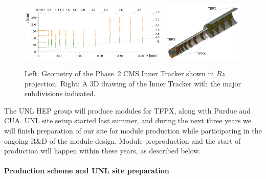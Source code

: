 \begin{figure}
\centering\includegraphics[width=0.63\textwidth]{figs/phase2_inner_tracker_geometry_lowres.png}
\centering\includegraphics[width=0.35\textwidth]{figs/phsae2_inner_tracker_3D.png}
\caption{\label{fig:TFPX} Left: Geometry of the Phase~2 CMS Inner Tracker shown in $Rz$ projection. Right: A 3D drawing of the Inner Tracker with the major subdivisions indicated.}
\end{figure}

The UNL HEP group will produce modules for TFPX, along with Purdue and CUA.  UNL site setup started last summer, and during the next three years we will finish preparation of our site for module production while participating in the ongoing R\&D of the module design. Module preproduction and the start of production will happen within these years, as described below.

\paragraph{Production scheme and UNL site preparation}

